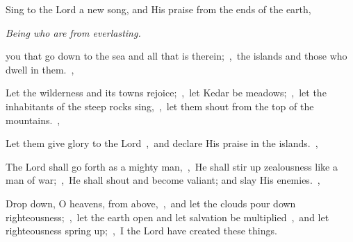 \documentclass[12pt,twoside,a5paper]{article}
\begin{document}
\begin{normalparskip}
  Sing to the Lord a new song, and His praise from the ends of the earth,


   \emph{Being who are from everlasting.}

  you that go down to the sea and all that is therein;~\sep\ the islands and those who dwell in them.~\sep

  Let the wilderness and its towns rejoice;~\sep\ let Kedar be meadows;~\sep\ let the inhabitants of the steep rocks sing,~\sep\ let them shout from the top of the mountains.~\sep

  Let them give glory to the Lord~\sep\ and declare His praise in the islands.~\sep

  The Lord shall go forth as a mighty man,~\sep\ He shall stir up zealousness like a man of war;~\sep\ He shall shout and become valiant; and slay His enemies.~\sep

  Drop down, O heavens, from above,~\sep\ and let the clouds pour down righteousness;~\sep\ let the earth open and let salvation be multiplied~\sep\ and let righteousness spring up;~\sep\ I the Lord have created these things.
\end{normalparskip}



\end{document}
